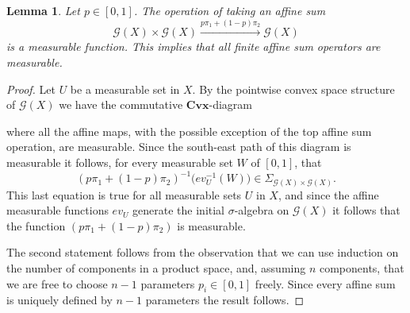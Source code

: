 \documentclass[11pt]{amsart}    %
\newtheorem{lemma}{Lemma}
\newcommand{\be}{\begin{equation}}
\newcommand{\ee}{\end{equation}}
\newcommand{\G}{\mathcal{G}}
\begin{document}
\begin{lemma} Let $p \in [0,1]$.  The operation of taking an affine sum
\be
\G(X) \times \G(X) \xrightarrow{ p \pi_1 + (1-p) \pi_2} \G(X)
\ee
is a measurable function.  This implies that all finite affine sum operators are measurable.
\end{lemma}
\begin{proof} 
Let $U$ be a measurable set in $X$. 
By the pointwise convex space structure of $\G(X)$ we have the commutative $\mathbf{Cvx}$-diagram
\begin{center}
\end{center}
where all the affine maps, with the possible exception of the top affine sum operation, are measurable. 
 Since the south-east path of this diagram is measurable  it follows, for every measurable set $W$ of $[0,1]$, that
\be
(p \pi_1 + (1-p) \pi_2)^{-1}\big(ev_U^{-1}(W)\big) \in \Sigma_{\G(X) \times \G(X)}.
\ee
This last equation is true for all measurable sets $U$ in $X$, and since the affine measurable functions $ev_U$ generate the initial $\sigma$-algebra on $\G(X)$ it follows that the function $(p \pi_1 + (1-p) \pi_2)$ is measurable.

The second statement follows from the observation that we can use induction on the number of components in a product space, and, assuming $n$ components, that we are free to choose $n-1$ parameters $p_i \in [0,1]$ freely.  Since every affine sum is uniquely defined by $n-1$ parameters the result follows.
\end{proof}
\end{document}

